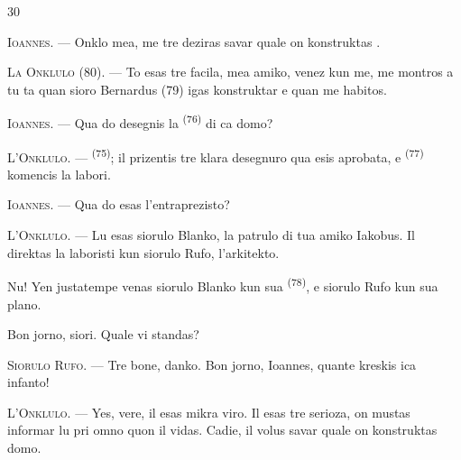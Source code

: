 %

\begin{VUpage}[32]{30}
\VUsaut{6.0mm}
\VUsaut{1.4mm}
\VUsaut{2.2mm}

\VUsaut{3.0mm}

\VUblancAlinea
\textsc{Ioannes}. --- Onklo mea, me tre deziras savar\nl
quale on konstruktas .

\VUblancAlinea
\textsc{La Onklulo} (80). --- To esas tre facila, mea\nl
amiko, venez kun me, me montros a tu ta\nl
quan sioro Bernardus (79) igas konstruktar e\nl
quan me habitos.

\VUblancAlinea
\textsc{Ioannes}. --- Qua do desegnis la  \textsuperscript{(76)} di\nl
ca domo?

\VUblancAlinea
\textsc{L'Onklulo}. ---  \textsuperscript{(75)}; il prizentis\nl
tre klara desegnuro qua esis aprobata, e \cc
{} \textsuperscript{(77)} komencis la labori.

\VUblancAlinea
\textsc{Ioannes}. --- Qua do esas l'entraprezisto?

\VUblancAlinea
\textsc{L'Onklulo}. --- Lu esas siorulo Blanko, la\nl
patrulo di tua amiko Iakobus. Il direktas la\nl
laboristi kun siorulo Rufo, l'arkitekto.

\VUblancAlinea
Nu! Yen justatempe venas siorulo Blanko\nl
kun sua  \textsuperscript{(78)}, e siorulo Rufo kun sua\nl
plano.

\VUblancAlinea
Bon jorno, siori. Quale vi standas?

\VUblancAlinea
\textsc{Siorulo Rufo}. --- Tre bone, danko. Bon\nl
jorno, Ioannes, quante kreskis ica infanto!

\VUblancAlinea
\textsc{L'Onklulo}. --- Yes, vere, il esas mikra viro.\nl
Il esas tre serioza, on mustas informar lu pri\nl
omno quon il vidas. Cadie, il volus savar\nl
quale on konstruktas domo.
\end{VUpage}

